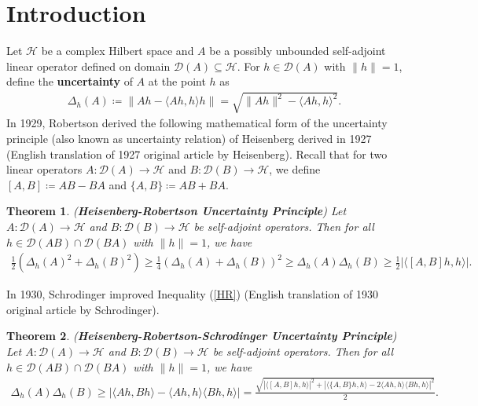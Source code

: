 \documentclass{amsart}
\newtheorem{theorem}{Theorem}[section]
\begin{document}
\section{Introduction}
Let $\mathcal{H}$ be a complex Hilbert space and $A$ be a possibly unbounded self-adjoint linear operator defined on domain $\mathcal{D}(A)\subseteq \mathcal{H}$. For $h \in \mathcal{D}(A)$ with $\|h\|=1$, define the \textbf{uncertainty} of $A$ at the point $h$ as 
\begin{align*}
	\Delta _h(A)\coloneqq \|Ah-\langle Ah, h \rangle h \|=\sqrt{\|Ah\|^2-\langle Ah, h \rangle^2}. 
\end{align*}
In 1929, Robertson \cite{ROBERTSON} derived the following mathematical form of the uncertainty principle (also known as uncertainty relation) of Heisenberg derived in 1927 \cite{HEISENBERG} (English translation of 1927 original article by Heisenberg). Recall that for two linear operators $A:	\mathcal{D}(A)\to  \mathcal{H}$ and $B:	\mathcal{D}(B)\to  \mathcal{H}$, we define $[A,B] \coloneqq AB-BA$ and $\{A,B\}\coloneqq AB+BA$.
\begin{theorem} \cite{ROBERTSON, CASSIDY, HEISENBERG, VONNEUMANNBOOK, DEBNATHMIKUSINSKI, OZAWA} (\textbf{Heisenberg-Robertson Uncertainty Principle}) \label{HRT}
Let  $A:	\mathcal{D}(A)\to  \mathcal{H}$ and $B:	\mathcal{D}(B)\to  \mathcal{H}$  be self-adjoint operators. Then for all $h \in \mathcal{D}(AB)\cap  \mathcal{D}(BA)$ with $\|h\|=1$, we have 
\begin{align}\label{HR}
 \frac{1}{2} \left(\Delta _h(A)^2+	\Delta _h(B)^2\right)\geq \frac{1}{4} \left(\Delta _h(A)+	\Delta _h(B)\right)^2 \geq  \Delta _h(A)	\Delta _h(B)   \geq  \frac{1}{2}|\langle [A,B]h, h \rangle |.
\end{align}
\end{theorem}
In 1930,  Schrodinger improved Inequality (\ref{HR}) \cite{SCHRODINGER} (English translation of 1930 original article by Schrodinger). 
\begin{theorem} \cite{SCHRODINGER}
	(\textbf{Heisenberg-Robertson-Schrodinger  Uncertainty Principle}) \label{HRS}
	Let  $A:	\mathcal{D}(A)\to  \mathcal{H}$ and $B:	\mathcal{D}(B)\to  \mathcal{H}$  be self-adjoint operators. Then for all $h \in \mathcal{D}(AB)\cap  \mathcal{D}(BA)$ with $\|h\|=1$, we have 
	\begin{align*}
		\Delta _h(A)	\Delta _h(B)    \geq |\langle Ah, Bh \rangle-\langle Ah, h \rangle \langle Bh, h \rangle|
		=\frac{\sqrt{|\langle [A,B]h, h \rangle |^2+|\langle \{A,B\}h, h \rangle -2\langle Ah, h \rangle\langle Bh, h \rangle|^2}}{2}.
	\end{align*}	
\end{theorem}
\end{document}

